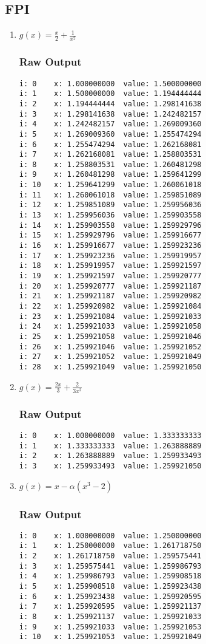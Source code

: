 \documentclass[11pt]{article} %
\begin{document}
\subsection*{FPI}
\begin{enumerate}
\item $g(x) = \frac{x}{2}+ \frac{1}{x^2}$
\subsubsection*{Raw Output}
\begin{verbatim}
i: 0	x: 1.000000000	value: 1.500000000
i: 1	x: 1.500000000	value: 1.194444444
i: 2	x: 1.194444444	value: 1.298141638
i: 3	x: 1.298141638	value: 1.242482157
i: 4	x: 1.242482157	value: 1.269009360
i: 5	x: 1.269009360	value: 1.255474294
i: 6	x: 1.255474294	value: 1.262168081
i: 7	x: 1.262168081	value: 1.258803531
i: 8	x: 1.258803531	value: 1.260481298
i: 9	x: 1.260481298	value: 1.259641299
i: 10	x: 1.259641299	value: 1.260061018
i: 11	x: 1.260061018	value: 1.259851089
i: 12	x: 1.259851089	value: 1.259956036
i: 13	x: 1.259956036	value: 1.259903558
i: 14	x: 1.259903558	value: 1.259929796
i: 15	x: 1.259929796	value: 1.259916677
i: 16	x: 1.259916677	value: 1.259923236
i: 17	x: 1.259923236	value: 1.259919957
i: 18	x: 1.259919957	value: 1.259921597
i: 19	x: 1.259921597	value: 1.259920777
i: 20	x: 1.259920777	value: 1.259921187
i: 21	x: 1.259921187	value: 1.259920982
i: 22	x: 1.259920982	value: 1.259921084
i: 23	x: 1.259921084	value: 1.259921033
i: 24	x: 1.259921033	value: 1.259921058
i: 25	x: 1.259921058	value: 1.259921046
i: 26	x: 1.259921046	value: 1.259921052
i: 27	x: 1.259921052	value: 1.259921049
i: 28	x: 1.259921049	value: 1.259921050
\end{verbatim}

\item $g(x) = \frac{2x}{3}+ \frac{2}{3x^2}$
\subsubsection*{Raw Output}
\begin{verbatim}
i: 0	x: 1.000000000	value: 1.333333333
i: 1	x: 1.333333333	value: 1.263888889
i: 2	x: 1.263888889	value: 1.259933493
i: 3	x: 1.259933493	value: 1.259921050
\end{verbatim}
\item $g(x) = x - \alpha(x^3 - 2)$
\subsubsection*{Raw Output}
\begin{verbatim}
i: 0	x: 1.000000000	value: 1.250000000
i: 1	x: 1.250000000	value: 1.261718750
i: 2	x: 1.261718750	value: 1.259575441
i: 3	x: 1.259575441	value: 1.259986793
i: 4	x: 1.259986793	value: 1.259908518
i: 5	x: 1.259908518	value: 1.259923438
i: 6	x: 1.259923438	value: 1.259920595
i: 7	x: 1.259920595	value: 1.259921137
i: 8	x: 1.259921137	value: 1.259921033
i: 9	x: 1.259921033	value: 1.259921053
i: 10	x: 1.259921053	value: 1.259921049
\end{verbatim}
\end{enumerate}
\end{document}
